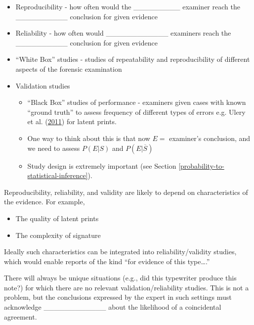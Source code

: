 \documentclass[]{book}
\providecommand{\tightlist}{%
  \setlength{\itemsep}{0pt}\setlength{\parskip}{0pt}}
\theoremstyle{definition}
\theoremstyle{definition}
\theoremstyle{remark}
\begin{document}
\begin{itemize}
\tightlist
\item
  Reproducibility - how often would the \_\_\_\_\_\_\_\_\_ examiner
  reach the \_\_\_\_\_\_\_\_\_\_ conclusion for given evidence
  \vspace{.1in}
\item
  Reliability - how often would \_\_\_\_\_\_\_\_\_\_\_\_ examiners reach
  the \_\_\_\_\_\_\_\_\_\_ conclusion for given evidence \vspace{.1in}
\item
  ``White Box'' studies - studies of repeatability and reproducibility
  of different aspects of the forensic examination
\item
  Validation studies

  \begin{itemize}
  \tightlist
  \item
    ``Black Box'' studies of performance - examiners given cases with
    known ``ground truth'' to assess frequency of different types of
    errors e.g. Ulery et al. (\protect\hyperlink{ref-uleryetal}{2011})
    for latent prints.
  \item
    One way to think about this is that now \(E=\) examiner's
    conclusion, and we need to assess \(P(E|S)\) and
    \(P(E|\overline{S})\)
  \item
    Study design is extremely important (see Section
    \ref{probability-to-statistical-inference}).
  \end{itemize}
\end{itemize}

Reproducibility, reliability, and validity are likely to depend on
characteristics of the evidence. For example,

\begin{itemize}
\tightlist
\item
  The quality of latent prints
\item
  The complexity of signature
\end{itemize}

Ideally such characteristics can be integrated into reliability/validity
studies, which would enable reports of the kind ``for evidence of this
type\ldots{}.''

There will always be unique situations (e.g., did this typewriter
produce this note?) for which there are no relevant
validation/reliability studies. This is not a problem, but the
conclusions expressed by the expert in such settings must acknowledge
\_\_\_\_\_\_\_\_\_\_\_\_ about the likelihood of a coincidental
agreement.
\end{document}
